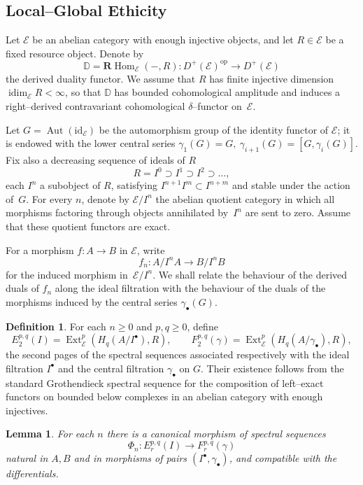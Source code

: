 \documentclass[12pt]{article}
\DeclareMathOperator{\Aut}{Aut}
\newcommand{\idim}{\operatorname{idim}}
\newcommand{\E}{\mathcal{E}}
\newcommand{\Ext}{\operatorname{Ext}}
\newcommand{\id}{\mathrm{id}}
\newcommand{\op}{\mathrm{op}}
\newcommand{\RHom}{\mathbf{R}\!\operatorname{Hom}}
\theoremstyle{plain}
\newtheorem{lemma}[theorem]{Lemma}
\theoremstyle{definition}
\newtheorem{definition}[theorem]{Definition}
\theoremstyle{remark}
\numberwithin{equation}{section}
\begin{document}
\subsection{Local–Global Ethicity}

Let \(\E\) be an abelian category with enough injective objects, and let \(R\in \E\) be a fixed resource object. Denote by
\[
\mathbb D=\RHom_\E(-,R):D^{+}(\E)^{\op}\to D^{+}(\E)
\]
the derived duality functor. We assume that \(R\) has finite injective dimension
\(\idim_\E R<\infty\), so that \(\mathbb D\) has bounded cohomological amplitude and induces a right–derived contravariant cohomological \(\delta\)–functor on~\(\E\).

Let \(G=\Aut(\id_\E)\) be the automorphism group of the identity functor of \(\E\); it is endowed with the lower central series
\(\gamma_1(G)=G,\ \gamma_{i+1}(G)=[G,\gamma_i(G)]\).  
Fix also a decreasing sequence of ideals of \(R\)
\[
R=I^0\supset I^1\supset I^2\supset\dots,
\]
each \(I^n\) a subobject of \(R\), satisfying \(I^{n+1}I^m\subset I^{n+m}\) and stable under the action of~\(G\). For every \(n\), denote by \(\E/I^n\) the abelian quotient category in which all morphisms factoring through objects annihilated by~\(I^n\) are sent to zero. Assume that these quotient functors are exact.  

For a morphism \(f:A\to B\) in \(\E\), write
\[
f_n:A/I^nA\longrightarrow B/I^nB
\]
for the induced morphism in~\(\E/I^n\).
We shall relate the behaviour of the derived duals of \(f_n\) along the ideal filtration with the behaviour of the duals of the morphisms induced by the central series \(\gamma_\bullet(G)\).

\begin{definition}
For each \(n\ge0\) and \(p,q\ge0\), define
\[
E^{p,q}_2(I)=\Ext^p_\E(H_q(A/I^\bullet),R),\qquad
F^{p,q}_2(\gamma)=\Ext^p_\E(H_q(A/\gamma_\bullet),R),
\]
the second pages of the spectral sequences associated respectively with the ideal filtration \(I^\bullet\) and the central filtration \(\gamma_\bullet\) on \(G\). Their existence follows from the standard Grothendieck spectral sequence for the composition of left–exact functors on bounded below complexes in an abelian category with enough injectives.
\end{definition}

\begin{lemma}
For each \(n\) there is a canonical morphism of spectral sequences
\[
\Phi_n:E^{p,q}_r(I)\longrightarrow F^{p,q}_r(\gamma)
\]
natural in \(A,B\) and in morphisms of pairs \((I^\bullet,\gamma_\bullet)\), and compatible with the differentials.  
\end{lemma}
\end{document}
